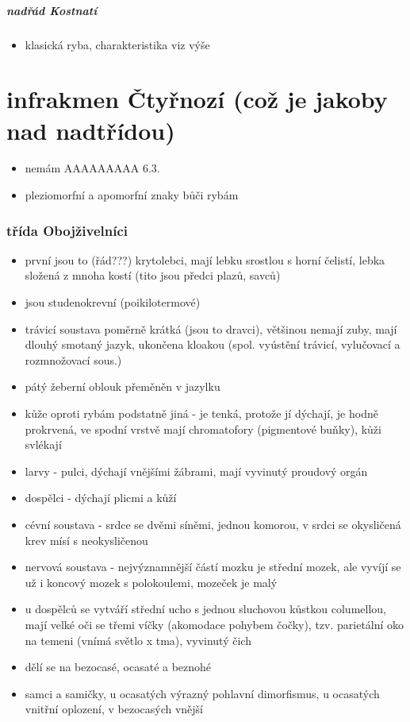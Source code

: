 \documentclass{article}
\begin{document}
\subsubsection{nadřád Kostnatí}
\begin{itemize}
  \item klasická ryba, charakteristika viz výše
\end{itemize}

\part{infrakmen Čtyřnozí (což je jakoby nad nadtřídou)}%
\begin{itemize}
  \item nemám AAAAAAAAA 6.3.
  \item pleziomorfní a apomorfní znaky bůči rybám
\end{itemize}

\section{třída Obojživelníci}
\begin{itemize}
  \item první jsou to (řád???) krytolebci, mají lebku srostlou s horní čelistí, lebka složená z mnoha kostí (tito jsou předci plazů, savců)
  \item jsou studenokrevní (poikilotermové)
  \item trávicí soustava poměrně krátká (jsou to dravci), většinou nemají zuby, mají dlouhý smotaný jazyk, ukončena kloakou (spol. vyústění trávicí, vylučovací a rozmnožovací sous.)
  \item pátý žeberní oblouk přeměněn v jazylku
  \item kůže oproti rybám podstatně jiná - je tenká, protože jí dýchají, je hodně prokrvená, ve spodní vrstvě mají chromatofory (pigmentové buňky), kůži svlékají
  \item larvy - pulci, dýchají vnějšími žábrami, mají vyvinutý proudový orgán
  \item dospělci - dýchají plicmi a kůží
  \item cévní soustava - srdce se dvěmi síněmi, jednou komorou, v srdci se okysličená krev mísí s neokysličenou
  \item nervová soustava - nejvýznamnější částí mozku je střední mozek, ale vyvíjí se už i koncový mozek s polokoulemi, mozeček je malý
  \item u dospělců se vytváří střední ucho s jednou sluchovou kůstkou columellou, mají velké oči se třemi víčky (akomodace pohybem čočky), tzv. parietální oko na temeni (vnímá světlo x tma), vyvinutý čich
  \item dělí se na bezocasé, ocasaté a beznohé
  \item samci a samičky, u ocasatých výrazný pohlavní dimorfismus, u ocasatých vnitřní oplození, v bezocasých vnější
\end{itemize}
\end{document}
